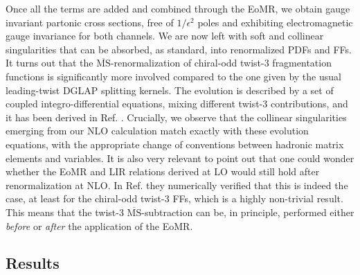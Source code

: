 Once all the terms are added and combined through the EoMR, we obtain gauge invariant partonic cross sections, free of $1/\epsilon^2$ poles and exhibiting electromagnetic gauge invariance for both channels. We are now left with soft and collinear singularities that can be absorbed, as standard, into renormalized PDFs and FFs. It turns out that the $\overline{\text{MS}}$-renormalization of chiral-odd twist-3 fragmentation functions is significantly more involved compared to the one given by the usual leading-twist DGLAP splitting kernels. The evolution is described by a set of coupled integro-differential equations, mixing different twist-3 contributions, and it has been derived in Ref. \cite{Ma_2017}. Crucially, we observe that the collinear singularities emerging from our NLO calculation match exactly with these evolution equations, with the appropriate change of conventions between hadronic matrix elements and variables. It is also very relevant to point out that one could wonder whether the EoMR and LIR relations derived at LO would still hold after renormalization at NLO. In Ref. \cite{Ma_2017} they numerically verified that this is indeed the case, at least for the chiral-odd twist-3 FFs, which is a highly non-trivial result. This means that the twist-3 $\overline{\text{MS}}$-subtraction can be, in principle, performed either \textit{before} or \textit{after} the application of the EoMR.


\subsection{Results}






